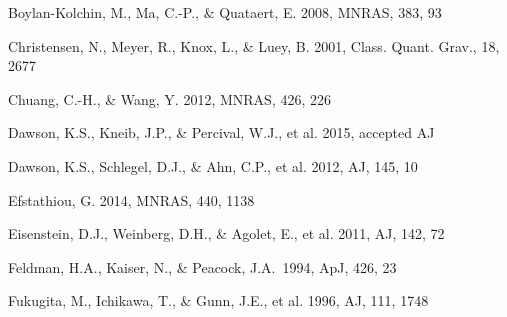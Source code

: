\documentclass[iop]{emulateapj}
\begin{document}
\begin{thebibliography}{}
Boylan-Kolchin, M., Ma, C.-P., \& Quataert, E. 2008, MNRAS, 383, 93






Christensen, N., Meyer, R., Knox, L., \& Luey, B. 2001, Class. Quant. Grav., 18, 2677


Chuang, C.-H., \& Wang, Y. 2012, MNRAS, 426, 226  



Dawson, K.S., Kneib, J.P., \& Percival, W.J., et al. 2015, accepted AJ

Dawson, K.S., Schlegel, D.J., \& Ahn, C.P., et al. 2012, AJ, 145, 10

Efstathiou, G. 2014, MNRAS, 440, 1138

Eisenstein, D.J.,  Weinberg, D.H., \& Agolet, E., et al. 2011, AJ, 142, 72

Feldman, H.A., Kaiser, N., \& Peacock, J.A.\ 1994, ApJ, 426, 23 

Fukugita, M., Ichikawa, T., \& Gunn, J.E., et al. 1996, AJ, 111, 1748




\end{thebibliography}
\end{document}
